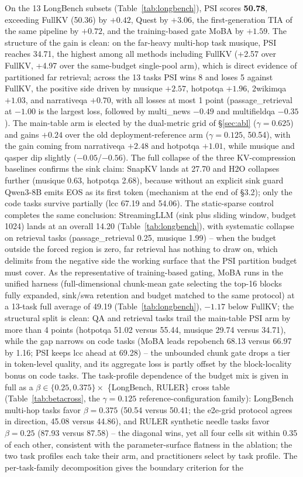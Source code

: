 \documentclass[11pt]{article}
\begin{document}
On the 13 LongBench subsets (Table~\ref{tab:longbench}), PSI scores \textbf{50.78}, exceeding FullKV (50.36) by $+0.42$, Quest by $+3.06$, the first-generation TIA of the same pipeline by $+0.72$, and the training-based gate MoBA by $+1.59$. The structure of the gain is clean: on the far-heavy multi-hop task musique, PSI reaches 34.71, the highest among all methods including FullKV (+2.57 over FullKV, +4.97 over the same-budget single-pool arm), which is direct evidence of partitioned far retrieval; across the 13 tasks PSI wins 8 and loses 5 against FullKV, the positive side driven by musique $+2.57$, hotpotqa $+1.96$, 2wikimqa $+1.03$, and narrativeqa $+0.70$, with all losses at most 1 point (passage\_retrieval at $-1.00$ is the largest loss, followed by multi\_news $-0.49$ and multifieldqa $-0.35$). The main-table arm is elected by the dual-metric grid of \S\ref{sec:abl} ($\gamma{=}0.625$) and gains $+0.24$ over the old deployment-reference arm ($\gamma{=}0.125$, 50.54), with the gain coming from narrativeqa $+2.48$ and hotpotqa $+1.01$, while musique and qasper dip slightly ($-0.05$/$-0.56$). The full collapse of the three KV-compression baselines confirms the sink claim: SnapKV lands at 27.70 and H2O collapses further (musique 0.63, hotpotqa 2.68), because without an explicit sink guard Qwen3-8B emits EOS as its first token (mechanism at the end of \S3.2); only the code tasks survive partially (lcc 67.19 and 54.06). The static-sparse control completes the same conclusion: StreamingLLM (sink plus sliding window, budget 1024) lands at an overall 14.20 (Table~\ref{tab:longbench}), with systematic collapse on retrieval tasks (passage\_retrieval 0.25, musique 1.99) -- when the budget outside the forced region is zero, far retrieval has nothing to draw on, which delimits from the negative side the working surface that the PSI partition budget must cover. As the representative of training-based gating, MoBA runs in the unified harness (full-dimensional chunk-mean gate selecting the top-16 blocks fully expanded, sink/swa retention and budget matched to the same protocol) at a 13-task full average of 49.19 (Table~\ref{tab:longbench}), $-1.17$ below FullKV; the structural split is clean: QA and retrieval tasks trail the main-table PSI arm by more than 4 points (hotpotqa 51.02 versus 55.44, musique 29.74 versus 34.71), while the gap narrows on code tasks (MoBA leads repobench 68.13 versus 66.97 by 1.16; PSI keeps lcc ahead at 69.28) -- the unbounded chunk gate drops a tier in token-level quality, and its aggregate loss is partly offset by the block-locality bonus on code tasks. The task-profile dependence of the budget mix is given in full as a $\beta \in \{0.25, 0.375\} \times$ \{LongBench, RULER\} cross table (Table~\ref{tab:betacross}, the $\gamma{=}0.125$ reference-configuration family): LongBench multi-hop tasks favor $\beta{=}0.375$ (50.54 versus 50.41; the e2e-grid protocol agrees in direction, 45.08 versus 44.86), and RULER synthetic needle tasks favor $\beta{=}0.25$ (87.93 versus 87.58) -- the diagonal wins, yet all four cells sit within 0.35 of each other, consistent with the parameter-surface flatness in the ablation; the two task profiles each take their arm, and practitioners select by task profile. The per-task-family decomposition gives the boundary criterion for the 
\end{document}

